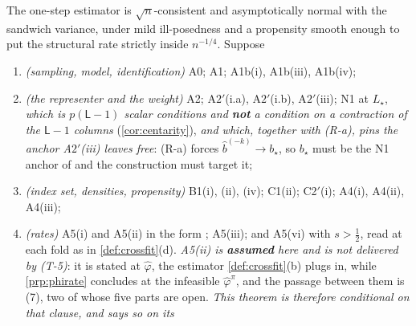 \begin{theorem}\label{thm:rootn}
The one-step estimator is $\sqrt n$-consistent and asymptotically normal with the sandwich variance, under
mild ill-posedness and a propensity smooth enough to put the structural rate strictly inside $n^{-1/4}$.
Suppose
\begin{enumerate}
\item[(T-1)] \emph{(sampling, model, identification)} A0; A1; A1b(i), A1b(iii), A1b(iv);
\item[(T-2)] \emph{(the representer and the weight)} A2; A$2'$(i.a), A$2'$(i.b), A$2'$(iii); N1 at
$L_\star$, \emph{which is $p(\mathsf L-1)$ scalar conditions and \textbf{not} a condition on a
contraction of the $\mathsf L-1$ columns} (\cref{cor:centarity}), \emph{and which, together with
\textup{(R-a)}, pins the anchor A$2'$\textup{(iii)} leaves free}: \textup{(R-a)} forces
$\hat b^{(-k)}\to b_\star$, so $b_\star$ must be the N1 anchor of  and the
construction must target it;
\item[(T-3)] \emph{(index set, densities, propensity)} B1(i), (ii), (iv); C1(ii); C2$'$(i); A4(i),
A4(ii), A4(iii);
\item[(T-4)] \emph{(rates)} A5(i) and A5(ii) in the form ; A5(iii); and A5(vi) with
$s>\tfrac12$, read at each fold as in \cref{def:crossfit}(d). \emph{A5(ii) is \textbf{assumed} here and
is not delivered by \textup{(T-5)}}: it is stated at $\hat\varphi$, the estimator
\cref{def:crossfit}\textup{(b)} plugs in, while \cref{prp:phirate} concludes at the infeasible
$\hat\varphi^{\pi}$, and the passage between them is \textup{(7)}, two of
whose five parts are open. \emph{This theorem is therefore conditional on that clause, and says so on its
}
\end{enumerate}
\end{theorem}

